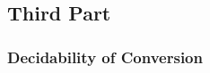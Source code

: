 \documentclass{book}
\begin{document}




\subsection{Third Part}

\subsubsection{Decidability of Conversion}
\end{document}
